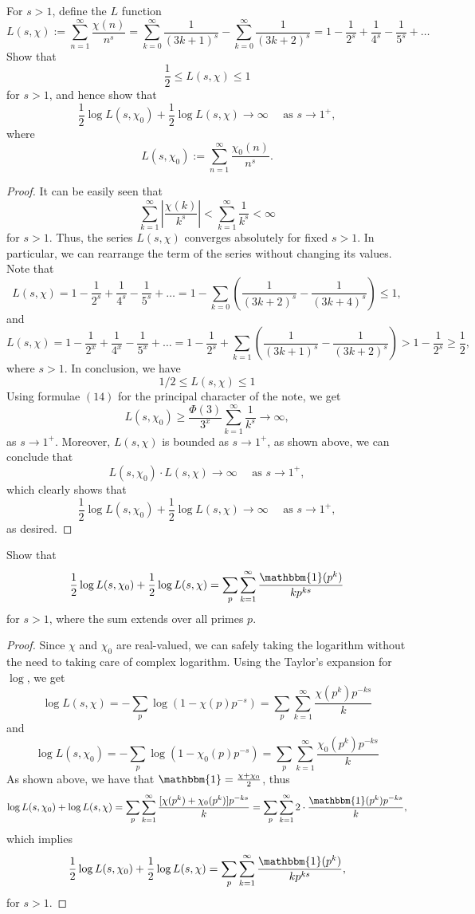 \documentclass[11pt,letterpaper]{article}
\DeclareMathOperator{\1}{\mathbbm{1}}
\begin{document}
\begin{exercise}\label{ex2}
  For $s>1$, define the $L$ function
  \[L(s,\chi):= \sum_{n=1}^\infty \dfrac{\chi(n)}{n^s} = \sum_{k=0}^\infty \dfrac{1}{(3k+1)^s}-\sum_{k=0}^\infty \dfrac{1}{(3k+2)^s} = 1- \dfrac{1}{2^s}+\dfrac{1}{4^s}-\dfrac{1}{5^s}+\ldots \]
  Show that
  \[\dfrac{1}{2} \le L(s,\chi) \le 1\]
  for $s>1$, and hence show that
  \[\dfrac{1}{2} \log L(s,\chi_0) + \dfrac{1}{2}\log L(s,\chi) \to \infty \quad \text{ as } s \to 1^+,\]
  where
  \[L(s,\chi_0):= \sum_{n=1}^\infty \dfrac{\chi_0(n)}{n^s}.\]
\end{exercise}
\begin{proof}
  It can be easily seen that \[\sum_{k=1}^\infty \left|\dfrac{\chi(k)}{k^s}\right|< \sum_{k=1}^\infty \dfrac{1}{k^s}<\infty\] for $s>1$. Thus, the series $L(s,\chi)$ converges absolutely for fixed $s>1$. In particular, we can rearrange the term of the series
  without changing its values. Note that
  \[L(s,\chi) = 1- \dfrac{1}{2^s}+\dfrac{1}{4^s}-\dfrac{1}{5^s}+\ldots = 1-\sum_{k=0}\left(\dfrac{1}{(3k+2)^s}-\dfrac{1}{(3k+4)^s}\right) \le 1,\]
  and
  \[L(s,\chi) = 1- \dfrac{1}{2^x}+\dfrac{1}{4^x}-\dfrac{1}{5^x}+\ldots = 1-\dfrac{1}{2^s}+\sum_{k=1}\left(\dfrac{1}{(3k+1)^s}-\dfrac{1}{(3k+2)^s}\right)>1-\dfrac{1}{2^s}\ge \dfrac{1}{2},\]
  where $s>1$. In conclusion, we have \[1/2 \le L(s,\chi) \le 1 \] Using formulae $(14)$ for the principal character of the note, we get
  \[ L(s,\chi_0) \ge \dfrac{\Phi(3)}{3^x}\sum_{k=1}^\infty \dfrac{1}{k^s} \longrightarrow \infty,\]
  as $s \to 1^+$. Moreover, $L(s,\chi)$ is bounded as $s \to 1^+$, as shown above, we can conclude that
  \[L(s,\chi_0) \cdot L(s,\chi) \to \infty \quad \text{ as } s \to 1^+,\] which clearly shows that \[\dfrac{1}{2} \log L(s,\chi_0) + \dfrac{1}{2}\log L(s,\chi) \to \infty \quad \text{ as } s \to 1^+,\] as desired.
\end{proof}
\newpage
\begin{exercise}
  \label{ex3}
  Show that
  \[\dfrac{1}{2}\log L(s,\chi_0)+ \dfrac{1}{2}\log L(s,\chi) = \sum_{p}\sum_{k=1}^\infty \dfrac{\mathbbm{1}(p^k)}{kp^{ks}}\]
  for $s>1$, where the sum extends over all primes $p$.
\end{exercise}
\begin{proof}
  Since $\chi$ and $\chi_0$ are real-valued, we can safely taking the logarithm without the need to taking care of
  complex logarithm. Using the Taylor's expansion for $\log$, we get
  \[ \log L(s,\chi) = - \sum_{p} \log(1-\chi(p)p^{-s}) = \sum_{p}\sum_{k=1}^\infty \dfrac{\chi(p^k)p^{-ks}}{k}\]
  and
  \[ \log L(s,\chi_0) = - \sum_{p} \log(1-\chi_0(p)p^{-s}) = \sum_{p}\sum_{k=1}^\infty \dfrac{\chi_0(p^k)p^{-ks}}{k}\]
  As shown above, we have that $\mathbbm{1}= \frac{\chi+\chi_0}{2}$, thus
  \[\log L(s,\chi_0)+ \log L(s,\chi) =\sum_{p}\sum_{k=1}^\infty \dfrac{[\chi(p^k)+\chi_0(p^k)]p^{-ks}}{k}= \sum_{p}\sum_{k=1}^\infty 2\cdot \dfrac{\mathbbm{1}(p^k)p^{-ks}}{k},\]
  which implies \[\dfrac{1}{2}\log L(s,\chi_0)+ \dfrac{1}{2}\log L(s,\chi) = \sum_{p}\sum_{k=1}^\infty \dfrac{\mathbbm{1}(p^k)}{kp^{ks}},\] for $s>1$.
\end{proof}
\end{document}
